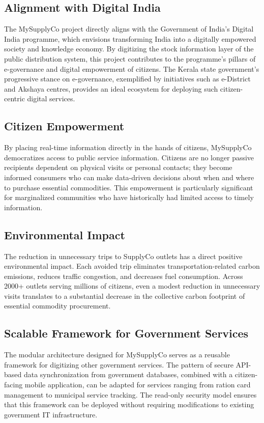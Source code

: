 \subsection{Alignment with Digital India}

The MySupplyCo project directly aligns with the Government of India's Digital India programme, which envisions transforming India into a digitally empowered society and knowledge economy. By digitizing the stock information layer of the public distribution system, this project contributes to the programme's pillars of e-governance and digital empowerment of citizens. The Kerala state government's progressive stance on e-governance, exemplified by initiatives such as e-District and Akshaya centres, provides an ideal ecosystem for deploying such citizen-centric digital services.

\subsection{Citizen Empowerment}

By placing real-time information directly in the hands of citizens, MySupplyCo democratizes access to public service information. Citizens are no longer passive recipients dependent on physical visits or personal contacts; they become informed consumers who can make data-driven decisions about when and where to purchase essential commodities. This empowerment is particularly significant for marginalized communities who have historically had limited access to timely information.

\subsection{Environmental Impact}

The reduction in unnecessary trips to SupplyCo outlets has a direct positive environmental impact. Each avoided trip eliminates transportation-related carbon emissions, reduces traffic congestion, and decreases fuel consumption. Across 2000+ outlets serving millions of citizens, even a modest reduction in unnecessary visits translates to a substantial decrease in the collective carbon footprint of essential commodity procurement.

\subsection{Scalable Framework for Government Services}

The modular architecture designed for MySupplyCo serves as a reusable framework for digitizing other government services. The pattern of secure API-based data synchronization from government databases, combined with a citizen-facing mobile application, can be adapted for services ranging from ration card management to municipal service tracking. The read-only security model ensures that this framework can be deployed without requiring modifications to existing government IT infrastructure.

